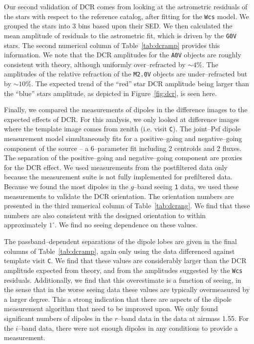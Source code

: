 \documentclass[prd, nofootinbib, floatfix, 11pt, tightenlines, times]{article}
\def\C{{\tt C}}
\begin{document}
Our second validation of DCR comes from looking at the astrometric
residuals of the stars with respect to the reference catalog, after
fitting for the {\tt Wcs} model.  We grouped the stars into 3 bins
based upon their SED.  We then calculated the mean amplitude of
residuals to the astrometric fit, which is driven by the {\tt G0V}
stars.  The second numerical column of Table~\ref{tab:dcramp} provides
this information.  We note that the DCR amplitudes for the {\tt A0V}
objects are roughly consistent with theory, although uniformly
over--refracted by $\sim 4\%$.  The amplitudes of the relative
refraction of the {\tt M2.0V} objects are under--refracted but by
$\sim 10\%$.  The expected trend of the ``red'' star DCR amplitude
being larger than the ``blue'' stars amplitude, as depicted in
Figure~\ref{fig:dcr}, is seen here.

Finally, we compared the measurements of dipoles in the difference
images to the expected effects of DCR.  For this analysis, we only
looked at difference images where the template image comes from zenith
(i.e. visit \C).  The joint--Psf dipole measurement model
simultaneously fits for a positive--going and negative--going
component of the source -- a 6--parameter fit including 2 centroids
and 2 fluxes.  The separation of the positive--going and
negative--going component are proxies for the DCR effect.  We used
measurements from the postfiltered data only because the measurement
suite is not fully implemented for prefiltered data.  Because we found
the most dipoles in the $g$--band seeing {\tt 1} data, we used these
measurements to validate the DCR orientation.  The orientation numbers
are presented in the third numerical column of Table~\ref{tab:dcrang}.
We find that these numbers are also consistent with the designed
orientation to within approximately $1^{\circ}$.  We find no seeing
dependence on these values.

The passband--dependent separations of the dipole lobes are given in
the final columns of Table~\ref{tab:dcramp}, again only using the data
differenced against template visit \C.  We find that these values are
considerably larger than the DCR amplitude expected from theory, and
from the amplitudes suggested by the {\tt Wcs} residuals.
Additionally, we find that this overestimate is a function of seeing,
in the sense that in the worse seeing data these values are typically
overmeasured by a larger degree.  This a strong indication that there
are aspects of the dipole measurement algorithm that need to be
improved upon.  We only found significant numbers of dipoles in the
$r$--band data in the data at airmass 1.55.  For the $i$--band data,
there were not enough dipoles in any conditions to provide a
measurement.
\end{document}
